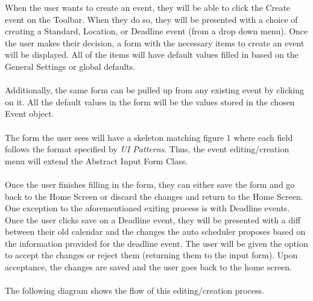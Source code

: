 \documentclass{scrreprt}
\begin{document}
When the user wants to create an event, they will be able to click the Create event on the Toolbar.  When they do so, they will be presented with a choice of creating a Standard, Location, or Deadline event (from a drop down menu). Once the user makes their decision, a form with the necessary items to create an event will be displayed.  All of the items will have default values filled in based on the General Settings or global defaults.
\\\\
Additionally, the same form can be pulled up from any existing event by clicking on  it.  All the default values in the form will be the values stored in the chosen Event object.
\\\\
The form the user sees will have a skeleton matching figure 1 where each field follows the format specified by \textit{UI Patterns}.  Thus, the event editing/creation menu will extend the Abstract Input Form Class.
\\\\
Once the user finishes filling in the form, they can either save the form and go back to the Home Screen or discard the changes and return to the Home Screen.
\\
One exception to the aforementioned exiting process is with Deadline events.  Once the user clicks save on a Deadline event, they will be presented with a diff between their old calendar and the changes the auto scheduler proposes based on the information provided for the deadline event.  The user will be given the option to accept the changes or reject them (returning them to the input form).  Upon acceptance, the changes are saved and the user goes back to the home screen.
\\\\
The following diagram shows the flow of this editing/creation process.
\\\\
\end{document}
